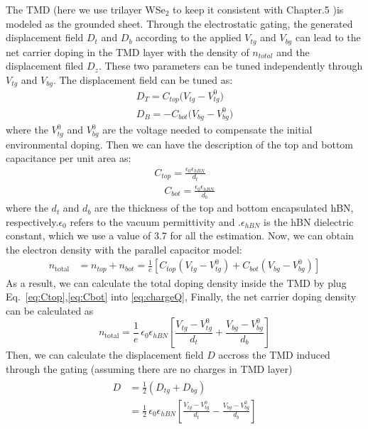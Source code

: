 The TMD (here we use trilayer WSe$_2$ to keep it consistent with Chapter.5 )is modeled as the grounded sheet. 
Through the electrostatic gating, the generated displacement field $D_t$ and $D_b$ according to the applied $V_{tg}$ and $V_{bg}$ can lead to the net carrier doping in the TMD layer with the density of $n_{total}$ and the displacement filed $D_z$. 
These two parameters can be tuned independently through $V_{tg}$ and $V_{bg}$. The displacement field can be tuned as:
\begin{align}
D_T = C_{top} \bigl(V_{tg} - V^0_{tg}\bigr)  \label{eq:Dfield_t} \\ D_B = -C_{bot} \bigl(V_{bg} - V^0_{bg}\bigr)
\label{eq:Dfield_b}
\end{align} 
where the $V^0_{tg}$ and $V^0_{bg}$ are the voltage needed to compensate the initial environmental doping.
Then we can have the description of the top and bottom capacitance per unit area as:
\begin{align}
C_{top} = \frac{\epsilon_{0}\epsilon_{hBN}}{d_{t}} \label{eq:Ctop} \\
\quad  C_{bot} = \frac{\epsilon_{0}\epsilon_{hBN}}{d_{b}} \label{eq:Cbot}
\end{align} 
where the $d_{t}$ and $d_{b}$ are the thickness of the top and bottom encapsulated hBN, respectively.$\epsilon_{0}$ refers to the vacuum permittivity and .$\epsilon_{hBN}$ is the hBN dielectric constant, which we use a value of 3.7 for all the estimation. 
Now, we can obtain the electron density with the parallel capacitor model:
\begin{align}
n_{\text{total}} &= n_{top} + n_{bot} = \frac{1}{e} \left[ C_{top} \left( V_{tg} - V^{0}_{tg} \right) 
+ C_{bot} \left( V_{bg} - V^{0}_{bg} \right) \right] \label{eq:chargeQ}
\end{align}
As a result, we can calculate the total doping density inside the TMD by plug Eq.~\ref{eq:Ctop},\ref{eq:Cbot} into \ref{eq:chargeQ}, Finally, the net carrier doping density can be calculated as
\begin{equation}
n_{\text{total}} = \frac{1}{e}\,\epsilon_{0}\epsilon_{hBN} 
\left[ \frac{ V_{tg} - V^{0}_{tg} }{d_t}
     + \frac{ V_{bg} - V^{0}_{bg} }{d_b} \right]
\label{eq:ntotal}
\end{equation}
Then, we can calculate the displacement field $D$ accross the TMD induced through the gating (assuming there are no charges in TMD layer)
\begin{align}
\begin{split}
D &= \frac{1}{2} \left( D_{tg} + D_{bg} \right) \\
  &= \frac{1}{2}\,\epsilon_{0}\epsilon_{hBN} 
     \left[ \frac{ V_{tg} - V^{0}_{tg} }{d_t} 
          - \frac{ V_{bg} - V^{0}_{bg} }{d_b} \right]
\end{split}
\label{eq:Fieldtotal}
\end{align}
